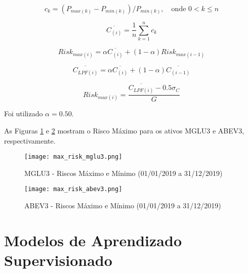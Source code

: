 \begin{itemize}
    \begin{equation} \label{eq:40}
        c_k = (P_{max(k)} - P_{min(k)}) / P_{min(k)}, \quad \textrm{onde } 0 < k \le n
    \end{equation}

    \begin{equation} \label{eq:41}
        \overline{C_{(i)}} = \dfrac{1}{n} \sum_{k=1}^{n} c_k
    \end{equation}

    \begin{equation} \label{eq:42}
        Risk_{max(i)} = \alpha \overline{C_{(i)}} + (1 - \alpha) Risk_{max(i-1)}
    \end{equation}

    \begin{equation} \label{eq:43}
        \overline{C_{LPF(i)}} = \alpha \overline{C_{(i)}} + (1 - \alpha) \overline{C_{(i-1)}}
    \end{equation}

    \begin{equation} \label{eq:44}
        Risk_{max(i)} = \dfrac{\overline{C_{LPF(i)}} - 0.5 \sigma_{C}}{G}
    \end{equation}

    Foi utilizado \begin{math} \alpha = 0.50 \end{math}.

    As Figuras \ref{fig:108} e \ref{fig:270} mostram o Risco Máximo para os ativos MGLU3 e ABEV3, respectivamente.

    \begin{figure}[!htb]
        \texttt{[image: max\_risk\_mglu3.png]}
        \centering
        \caption{MGLU3 - Riscos Máximo e Mínimo (01/01/2019 a 31/12/2019)}
        \label{fig:108}
    \end{figure}

    \begin{figure}[!htb]
        \texttt{[image: max\_risk\_abev3.png]}
        \centering
        \caption{ABEV3 - Riscos Máximo e Mínimo (01/01/2019 a 31/12/2019)}
        \label{fig:270}
    \end{figure}

\end{itemize}




\FloatBarrier
\section{Modelos de Aprendizado Supervisionado}
\label{sub:super_models}


